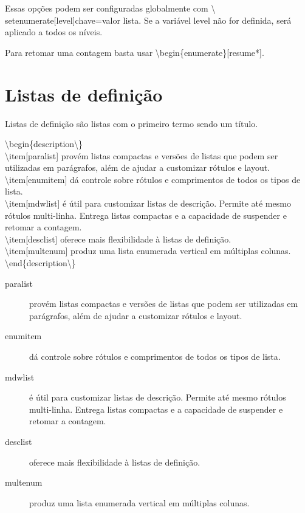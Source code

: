 Essas opções podem ser configuradas globalmente com \textbackslash
setenumerate[level]{chave=valor lista}. Se a variável level não for definida,
será aplicado a todos os níveis.

Para retomar uma contagem basta usar \textbackslash begin\{enumerate\}[resume*].

\section{Listas de definição}
Listas de definição são listas com o primeiro termo sendo um título.

\noindent\textbackslash begin\{description\textbackslash \}\\
	\textbackslash item[paralist] provém listas compactas e versões de listas que podem ser utilizadas em parágrafos, além de ajudar a customizar rótulos e layout.\\
	\textbackslash item[enumitem] dá controle sobre rótulos e comprimentos de todos os tipos de lista.\\
	\textbackslash item[mdwlist] é útil para customizar listas de descrição. Permite até mesmo rótulos multi-linha. Entrega listas compactas e a capacidade de suspender e retomar a contagem.\\
	\textbackslash item[desclist] oferece mais flexibilidade à listas de definição.\\
	\textbackslash item[multenum] produz uma lista enumerada vertical em múltiplas colunas.\\
\textbackslash end\{description\textbackslash \}\\

\begin{description}
	\item[paralist] provém listas compactas e versões de listas que podem ser utilizadas em parágrafos, além de ajudar a customizar rótulos e layout.
	\item[enumitem] dá controle sobre rótulos e comprimentos de todos os tipos de lista.
	\item[mdwlist] é útil para customizar listas de descrição. Permite até mesmo rótulos multi-linha. Entrega listas compactas e a capacidade de suspender e retomar a contagem.
	\item[desclist] oferece mais flexibilidade à listas de definição.
	\item[multenum] produz uma lista enumerada vertical em múltiplas colunas.
\end{description}

